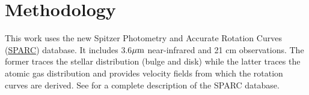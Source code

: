 \section{Methodology}
\label{sec:fitting}
This work uses the new Spitzer Photometry and Accurate Rotation Curves (\href{http://astroweb.cwru.edu/SPARC/}{SPARC}) database. It includes 3.6$\mbox{$\mu$m}$ near-infrared and 21 cm observations. The former traces the stellar distribution (bulge and disk) while the latter traces the atomic gas distribution and provides velocity fields from which the rotation curves are derived. See \citet{2016AJ....152..157L} for a complete description of the SPARC database.





